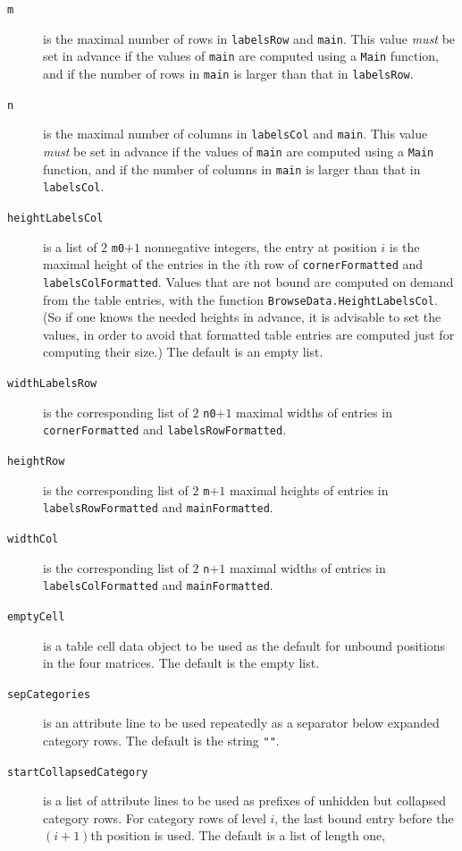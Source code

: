 \documentclass[a4paper,11pt]{report}
\begin{document}
{{{\begin{description}
\item[{\texttt{m}}]  is the maximal number of rows in \texttt{labelsRow} and \texttt{main}. This value \emph{must} be set in advance if the values of \texttt{main} are computed using a \texttt{Main} function, and if the number of rows in \texttt{main} is larger than that in \texttt{labelsRow}. 
\item[{\texttt{n}}]  is the maximal number of columns in \texttt{labelsCol} and \texttt{main}. This value \emph{must} be set in advance if the values of \texttt{main} are computed using a \texttt{Main} function, and if the number of columns in \texttt{main} is larger than that in \texttt{labelsCol}. 
\item[{\texttt{heightLabelsCol}}]  is a list of $2$ \texttt{m0}$ + 1$ nonnegative integers, the entry at position $i$ is the maximal height of the entries in the $i$\texttt{}th row of \texttt{cornerFormatted} and \texttt{labelsColFormatted}. Values that are not bound are computed on demand from the table entries,
with the function \texttt{BrowseData.HeightLabelsCol}.  (So if one knows the needed heights in advance, it is advisable to set the
values, in order to avoid that formatted table entries are computed just for
computing their size.) The default is an empty list. 
\item[{\texttt{widthLabelsRow}}]  is the corresponding list of $2$ \texttt{n0}$ + 1$ maximal widths of entries in \texttt{cornerFormatted} and \texttt{labelsRowFormatted}. 
\item[{\texttt{heightRow}}]  is the corresponding list of $2$ \texttt{m}$ + 1$ maximal heights of entries in \texttt{labelsRowFormatted} and \texttt{mainFormatted}. 
\item[{\texttt{widthCol}}]  is the corresponding list of $2$ \texttt{n}$ + 1$ maximal widths of entries in \texttt{labelsColFormatted} and \texttt{mainFormatted}. 
\item[{\texttt{emptyCell}}]  is a table cell data object to be used as the default for unbound positions in
the four matrices. The default is the empty list. 
\item[{\texttt{sepCategories}}]  is an attribute line to be used repeatedly as a separator below expanded
category rows. The default is the string \texttt{"\texttt{}"}. 
\item[{\texttt{startCollapsedCategory}}]  is a list of attribute lines to be used as prefixes of unhidden but collapsed
category rows. For category rows of level $i$, the last bound entry before the $(i+1)$\texttt{}th position is used. The default is a list of length one,

\end{description}}}}
\end{document}
